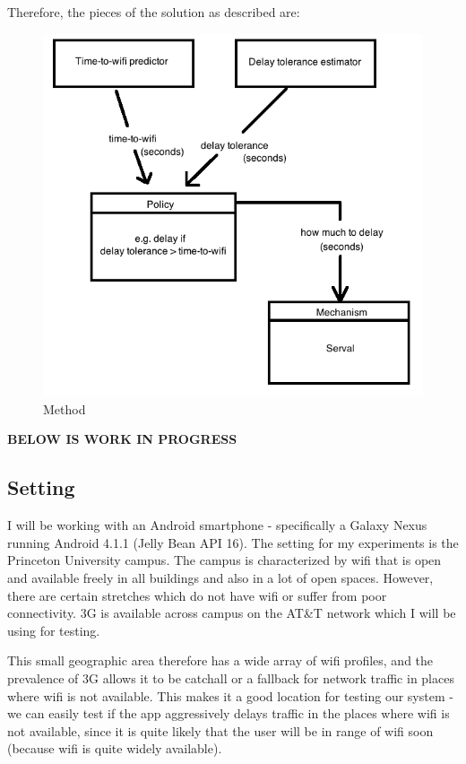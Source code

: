 \documentclass[12pt, fleqn]{article}
\begin{document}
\noindent Therefore, the pieces of the solution as described are:

\newpage
\begin{figure}[htp]
\centering
\includegraphics[scale=0.8]{img/method-flowchart.png}
\caption{Method\label{fig-method-flowchart}}
\end{figure}
\medskip

\newpage
\textbf{BELOW IS WORK IN PROGRESS}
\newpage

\subsection{Setting}

I will be working with an Android smartphone - specifically a Galaxy Nexus 
running Android 4.1.1 (Jelly Bean API 16). The setting for my experiments is the 
Princeton University campus. The campus is characterized by wifi that is open 
and available freely in all buildings and also in a lot of open spaces. However, 
there are certain stretches which do not have wifi or suffer from poor 
connectivity. 3G is available across campus on the AT&T network which 
I will be using for testing. 

This small geographic area therefore has a wide array of wifi profiles, and the 
prevalence of 3G allows it to be catchall or a fallback for network traffic in 
places where wifi is not available. This makes it a good location for testing 
our system - we can easily test if the app aggressively delays traffic in 
the places where wifi is not available, since it is quite likely that the user 
will be in range of wifi soon (because wifi is quite widely available).
\end{document}
